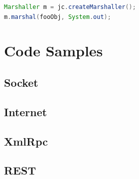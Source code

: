 \documentclass[10pt]{article}
\begin{document}
\begin{lstlisting}[language=Java, caption=Marshalling, style=JavaStyle]
Marshaller m = jc.createMarshaller();
m.marshal(fooObj, System.out);
\end{lstlisting}

\newpage
\section{Code Samples}
\subsection{Socket}


\subsection{Internet}


\subsection{XmlRpc}


\subsection{REST}


\end{document}
